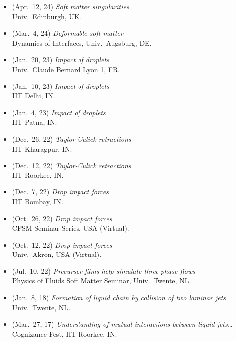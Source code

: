 \begin{itemize}[leftmargin=1.5em]
  Burgers Symposium, NL.
\item[\textbullet] (Apr.~12, 24) \emph{Soft matter singularities} \\
  Univ.~Edinburgh, UK.
\item[\textbullet] (Mar.~4, 24) \emph{Deformable soft matter} \\
  Dynamics of Interfaces, Univ.~Augsburg, DE.
\item[\textbullet] (Jan.~20, 23) \emph{Impact of droplets} \\
  Univ.~Claude Bernard Lyon 1, FR.
\item[\textbullet] (Jan.~10, 23) \emph{Impact of droplets} \\
  IIT Delhi, IN.
\item[\textbullet] (Jan.~4, 23) \emph{Impact of droplets} \\
  IIT Patna, IN.
\item[\textbullet] (Dec.~26, 22) \emph{Taylor-Culick retractions} \\
  IIT Kharagpur, IN.
\item[\textbullet] (Dec.~12, 22) \emph{Taylor-Culick retractions} \\
  IIT Roorkee, IN.
\item[\textbullet] (Dec.~7, 22) \emph{Drop impact forces} \\
  IIT Bombay, IN.
\item[\textbullet] (Oct.~26, 22) \emph{Drop impact forces} \\
  CFSM Seminar Series, USA (Virtual). \href{https://www.youtube.com/live/enTMAucwUDs?si=Dm-IJ3A0o7AhMc2T}{\color{red}\faYoutube}
\item[\textbullet] (Oct.~12, 22) \emph{Drop impact forces} \\
  Univ.~Akron, USA (Virtual).
\item[\textbullet] (Jul.~10, 22) \emph{Precursor films help simulate three-phase flows} \\
  Physics of Fluids Soft Matter Seminar, Univ.~Twente, NL. \href{https://youtu.be/ozrnYe8u1HA?si=DA4JIFjNozmPsQuE}{\color{red}\faYoutube}
\item[\textbullet] (Jan.~8, 18) \emph{Formation of liquid chain by collision of two laminar jets} \\
  Univ.~Twente, NL.
\item[\textbullet] (Mar.~27, 17) \emph{Understanding of mutual interactions between liquid jets\ldots} \\
  Cognizance Fest, IIT Roorkee, IN.
\end{itemize}


